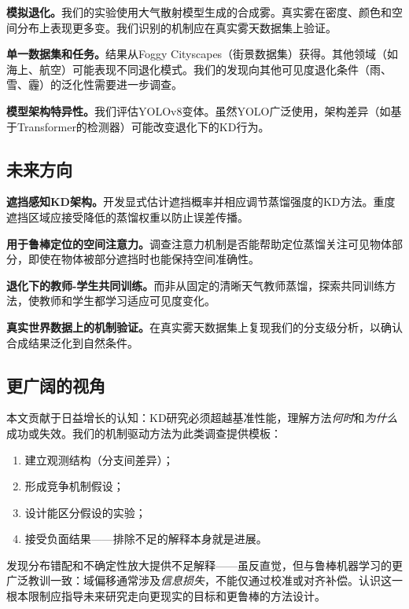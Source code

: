 \textbf{模拟退化。}我们的实验使用大气散射模型生成的合成雾。真实雾在密度、颜色和空间分布上表现更多变。我们识别的机制应在真实雾天数据集上验证。

\textbf{单一数据集和任务。}结果从Foggy Cityscapes（街景数据集）获得。其他领域（如海上、航空）可能表现不同退化模式。我们的发现向其他可见度退化条件（雨、雪、霾）的泛化性需要进一步调查。

\textbf{模型架构特异性。}我们评估YOLOv8变体。虽然YOLO广泛使用，架构差异（如基于Transformer的检测器）可能改变退化下的KD行为。

\subsection{未来方向}

\textbf{遮挡感知KD架构。}开发显式估计遮挡概率并相应调节蒸馏强度的KD方法。重度遮挡区域应接受降低的蒸馏权重以防止误差传播。

\textbf{用于鲁棒定位的空间注意力。}调查注意力机制是否能帮助定位蒸馏关注可见物体部分，即使在物体被部分遮挡时也能保持空间准确性。

\textbf{退化下的教师-学生共同训练。}而非从固定的清晰天气教师蒸馏，探索共同训练方法，使教师和学生都学习适应可见度变化。

\textbf{真实世界数据上的机制验证。}在真实雾天数据集上复现我们的分支级分析，以确认合成结果泛化到自然条件。

\subsection{更广阔的视角}

本文贡献于日益增长的认知：KD研究必须超越基准性能，理解方法\emph{何时}和\emph{为什么}成功或失效。我们的机制驱动方法为此类调查提供模板：
\begin{enumerate}
    \item 建立观测结构（分支间差异）；
    \item 形成竞争机制假设；
    \item 设计能区分假设的实验；
    \item 接受负面结果——排除不足的解释本身就是进展。
\end{enumerate}

发现分布错配和不确定性放大提供不足解释——虽反直觉，但与鲁棒机器学习的更广泛教训一致：域偏移通常涉及\emph{信息损失}，不能仅通过校准或对齐补偿。认识这一根本限制应指导未来研究走向更现实的目标和更鲁棒的方法设计。
